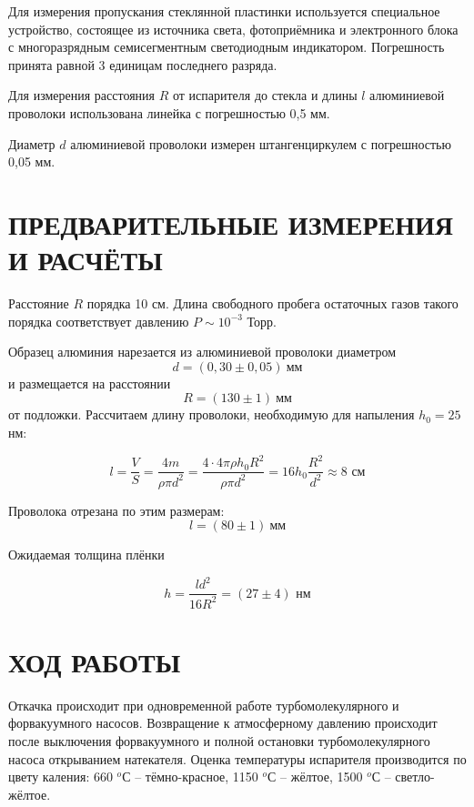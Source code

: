 \documentclass[a4paper, 14pt]{extarticle}
\begin{document}
	Для измерения пропускания стеклянной пластинки используется специальное устройство, состоящее из источника света, фотоприёмника и электронного блока с многоразрядным семисегментным светодиодным индикатором. Погрешность принята равной 3 единицам последнего разряда.
	
	Для измерения расстояния $R$ от испарителя до стекла и длины $l$ алюминиевой проволоки использована линейка с погрешностью 0,5 мм. 
	
	Диаметр $d$ алюминиевой проволоки измерен штангенциркулем с погрешностью 0,05 мм.
	
	\section{ПРЕДВАРИТЕЛЬНЫЕ ИЗМЕРЕНИЯ И РАСЧЁТЫ} 
	
	Расстояние $R$ порядка 10 см. Длина свободного пробега остаточных газов такого порядка соответствует давлению $P \sim 10^{-3}$ Торр.
	
	Образец алюминия нарезается из алюминиевой проволоки диаметром \[ d = (0,30 \pm 0,05) \ \text{мм} \] и размещается на расстоянии \[ R = (130 \pm 1) \ \text{мм} \] от подложки. Рассчитаем длину проволоки, необходимую для напыления $h_0 = 25$ нм:
	
	\begin{equation}
		l = \frac{V}{S} = \dfrac{4m}{\rho\pi d^2} = \frac{4 \cdot 4\pi\rho h_0 R^2}{\rho \pi d^2} = 16 h_0 \frac{R^2}{d^2} \approx 8 \text{ см}
	\end{equation}
	
	Проволока отрезана по этим размерам: \[ l = (80 \pm 1) \ \text{мм} \] 
	
	Ожидаемая толщина плёнки
	
	\begin{equation}
		h =  \frac{l d^2}{16 R^2} = (27 \pm 4)  \text{ нм} 
	\end{equation}
	
	\section{ХОД РАБОТЫ}
	
	Откачка происходит при одновременной работе турбомолекулярного и форвакуумного насосов. Возвращение к атмосферному давлению происходит после выключения форвакуумного и полной остановки турбомолекулярного насоса открыванием натекателя. Оценка температуры испарителя производится по цвету каления: 660 $^o$С -- тёмно-красное, 1150 $^o$С -- жёлтое, 1500 $^o$С -- светло-жёлтое.
	
\end{document}
